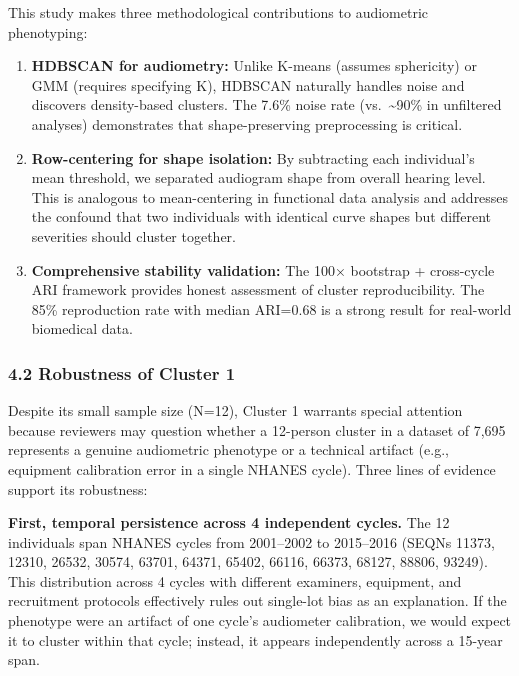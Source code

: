 \documentclass[
]{article}
\begin{document}
This study makes three methodological contributions to audiometric phenotyping:

\begin{enumerate}
\def\labelenumi{\arabic{enumi}.}
\item
  \textbf{HDBSCAN for audiometry:} Unlike K-means (assumes sphericity) or GMM
  (requires specifying K), HDBSCAN naturally handles noise and discovers
  density-based clusters. The 7.6\% noise rate (vs.~\textasciitilde90\% in
  unfiltered analyses) demonstrates that shape-preserving preprocessing is
  critical.
\item
  \textbf{Row-centering for shape isolation:} By subtracting each individual's
  mean threshold, we separated audiogram shape from overall hearing level. This
  is analogous to mean-centering in functional data analysis and addresses the
  confound that two individuals with identical curve shapes but different
  severities should cluster together.
\item
  \textbf{Comprehensive stability validation:} The 100× bootstrap + cross-cycle
  ARI framework provides honest assessment of cluster reproducibility. The 85\%
  reproduction rate with median ARI=0.68 is a strong result for real-world
  biomedical data.
\end{enumerate}

\subsubsection{4.2 Robustness of Cluster 1}\label{robustness-of-cluster-1}

Despite its small sample size (N=12), Cluster 1 warrants special attention
because reviewers may question whether a 12-person cluster in a dataset of 7,695
represents a genuine audiometric phenotype or a technical artifact (e.g.,
equipment calibration error in a single NHANES cycle). Three lines of evidence
support its robustness:

\textbf{First, temporal persistence across 4 independent cycles.} The 12
individuals span NHANES cycles from 2001--2002 to 2015--2016 (SEQNs 11373,
12310, 26532, 30574, 63701, 64371, 65402, 66116, 66373, 68127, 88806, 93249).
This distribution across 4 cycles with different examiners, equipment, and
recruitment protocols effectively rules out single-lot bias as an explanation.
If the phenotype were an artifact of one cycle's audiometer calibration, we
would expect it to cluster within that cycle; instead, it appears independently
across a 15-year span.
\end{document}
